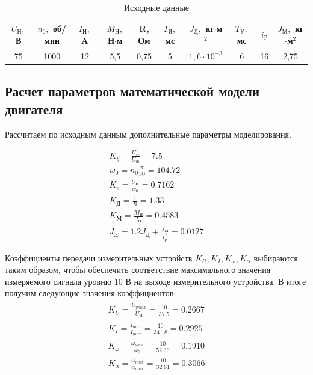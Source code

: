 \documentclass[a4paper, 12pt]{article}
\begin{document}
\begin{table}[h!]
	\centering
	\begin{threeparttable}
		\caption{Исходные данные}
		\begin{tabular}{|c|c|c|c|c|c|c|c|c|c|}
			\hline
			\makecell{$U_\text{Н},$\\В} & \makecell{$n_0,$\\об/мин} & \makecell{$I_\text{Н},$\\A} & \makecell{$M_\text{Н},$\\Н$\cdot$м} & \makecell{R,\\Ом} & \makecell{$T_\text{Я},$\\мс} & \makecell{$J_\text{Д},$\\кг$\cdot$м$^2$} & \makecell{$T_\text{У},$\\мс} &
			$i_\text{Р}$
			& \makecell{$J_\text{М},$\\кг$\cdot$м$^2$} \\
			\hline
			75 & 1000 & 12 & 5,5 & 0,75 & 5 & $1,6\cdot10^{-3}$ & 6 & 16 & 2,75\\
			\hline
		\end{tabular}
		\label{tab:dateTab}
	\end{threeparttable}
\end{table}

\newpage

\begin{center}
	\section{Расчет параметров математической модели двигателя}
\end{center}\par
Рассчитаем по исходным данным дополнительные параметры моделирования.\par

\begin{gather}
	K_y  = \frac{U_\text{Н}}{U_m}  = 7.5\\
	w_0  = n_0\frac{\pi}{30} = 104.72 \\
	K_e  = \frac{U_\text{Н}}{w_0} = 0.7162\\
	K_\text{Д}  = \frac{1}{R} = 1.33 \\
	K_\text{М}  = \frac{M_\text{Н}}{I_\text{Н}} =  0.4583\\
	J_{\Sigma}  = 1.2J_\text{Д} + \frac{J_\text{М}}{i^2_p} = 0.0127
\end{gather} \par
Коэффициенты передачи измерительных устройств $K_U, K_I, K_\omega, K_\alpha$ выбираются таким образом, чтобы обеспечить соответствие максимального значения измеряемого сигнала уровню 10 В на выходе измерительного устройства. В итоге получим следующие значения коэффициентов:
\begin{gather}
	K_U = \frac{\hat{U}_{ymax}}{U_\text{Н}} = \frac{10}{37.5} = 0.2667\\
	K_I = \frac{\hat{I}_{max}}{I_{max}} = \frac{10}{34.18} =  0.2925\\
	K_\omega = \frac{\hat{\omega}_{max}}{\omega_0} = \frac{10}{52.36} = 0.1910\\
	K_\alpha = \frac{\hat{\alpha}_{max}}{\alpha_{max}} = \frac{10}{32.61} = 0.3066
\end{gather}
\end{document}
